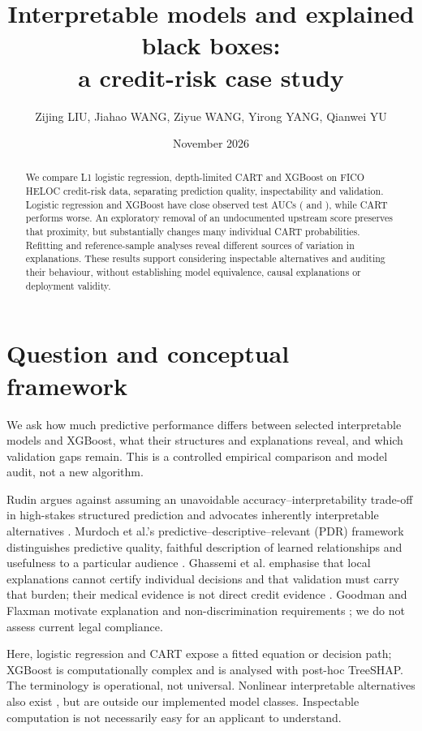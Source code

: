 \documentclass[11pt,a4paper]{article}
\title{\vspace{-1.2cm}Interpretable models and explained black boxes:\\a credit-risk case study}
\author{Zijing LIU, Jiahao WANG, Ziyue WANG, Yirong YANG, Qianwei YU}
\date{November 2026}
\begin{document}
\maketitle
\vspace{-0.7cm}
\begin{abstract}
We compare L1 logistic regression, depth-limited CART and XGBoost on FICO HELOC credit-risk data, separating prediction quality, inspectability and validation. Logistic regression and XGBoost have close observed test AUCs (\TestAUCLR{} and \TestAUCXGB{}), while CART performs worse. An exploratory removal of an undocumented upstream score preserves that proximity, but substantially changes many individual CART probabilities. Refitting and reference-sample analyses reveal different sources of variation in explanations. These results support considering inspectable alternatives and auditing their behaviour, without establishing model equivalence, causal explanations or deployment validity.
\end{abstract}

\section{Question and conceptual framework}
We ask how much predictive performance differs between selected interpretable models and XGBoost, what their structures and explanations reveal, and which validation gaps remain. This is a controlled empirical comparison and model audit, not a new algorithm.

Rudin argues against assuming an unavoidable accuracy--interpretability trade-off in high-stakes structured prediction and advocates inherently interpretable alternatives \cite{rudin2019stop}. Murdoch et al.'s predictive--descriptive--relevant (PDR) framework distinguishes predictive quality, faithful description of learned relationships and usefulness to a particular audience \cite{murdoch2019definitions}. Ghassemi et al. emphasise that local explanations cannot certify individual decisions and that validation must carry that burden; their medical evidence is not direct credit evidence \cite{ghassemi2021false}. Goodman and Flaxman motivate explanation and non-discrimination requirements \cite{goodman2017eu}; we do not assess current legal compliance.

Here, logistic regression and CART expose a fitted equation or decision path; XGBoost is computationally complex and is analysed with post-hoc TreeSHAP. The terminology is operational, not universal. Nonlinear interpretable alternatives also exist \cite{chen2022holistic}, but are outside our implemented model classes. Inspectable computation is not necessarily easy for an applicant to understand.
\end{document}
